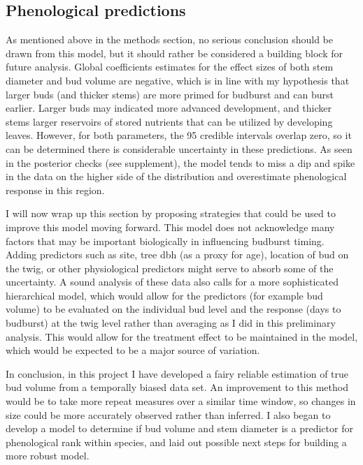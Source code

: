 \documentclass{article}\usepackage[]{graphicx}\usepackage[]{color}
\begin{document}
\subsection*{Phenological predictions}
\par As mentioned above in the methods section, no serious conclusion should be drawn from this model, but it should rather be considered a building block for future analysis. Global coefficients estimates for the effect sizes of both stem diameter and bud volume are negative, which is in line with my hypothesis that larger buds (and thicker stems) are more primed for budburst and can burst earlier. Larger buds may indicated more advanced development, and thicker stems larger reservoirs of stored nutrients that can be utilized by developing leaves. However, for both parameters, the 95 credible intervals overlap zero, so it can be determined there is considerable uncertainty in these predictions. As seen in the posterior checks (see supplement), the model tends to miss a dip and spike in the data on the higher side of the distribution and overestimate phenological response in this region.
\par I will now wrap up this section by proposing strategies that could be used to improve this model moving forward. This model does not acknowledge many factors that may be important biologically in influencing budburst timing. Adding predictors such as site, tree dbh (as a proxy for age), location of bud on the twig, or other physiological predictors might serve to absorb some of the uncertainty. A sound analysis of these data also calls for a more sophisticated hierarchical model, which would allow for the predictors (for example bud volume) to be evaluated on the individual bud level and the response (days to budburst) at the twig level rather than averaging as I did in this preliminary analysis. This would allow for the treatment effect to be maintained in the model, which would be expected to be a major source of variation.
\par In conclusion, in this project I have developed a fairy reliable  estimation of true bud volume from a temporally biased data set. An improvement to this method would be to take more repeat measures over a similar time window, so changes in size could be more accurately observed rather than inferred. I also began to develop a model to determine if bud volume and stem diameter is a predictor for phenological rank within species, and laid out possible next steps for building a more robust model.
\end{document}
